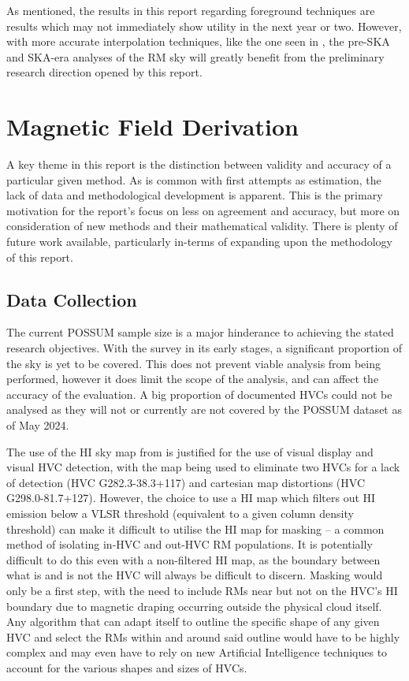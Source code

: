 As mentioned, the results in this report regarding foreground techniques are results which may not immediately show utility in the next year or two. However, with more accurate interpolation techniques, like the one seen in \cite{ID58}, the pre-SKA and SKA-era analyses of the RM sky will greatly benefit from the preliminary research direction opened by this report.

\section{Magnetic Field Derivation}
\label{sec:mag_disc}

A key theme in this report is the distinction between validity and accuracy of a particular given method. As is common with first attempts as estimation, the lack of data and methodological development is apparent. This is the primary motivation for the report's focus on less on agreement and accuracy, but more on consideration of new methods and their mathematical validity. There is plenty of future work available, particularly in-terms of expanding upon the methodology of this report.

\subsection{Data Collection}
\label{ssec:B1}

The current POSSUM sample size is a major hinderance to achieving the stated research objectives. With the survey in its early stages, a significant proportion of the sky is yet to be covered. This does not prevent viable analysis from being performed, however it does limit the scope of the analysis, and can affect the accuracy of the evaluation. A big proportion of documented HVCs could not be analysed as they will not or currently are not covered by the POSSUM dataset as of May 2024.


The use of the HI sky map from \cite{ID6} is justified for the use of visual display and visual HVC detection, with the map being used to eliminate two HVCs for a lack of detection (HVC G282.3-38.3+117) and cartesian map distortions (HVC G298.0-81.7+127). However, the choice to use a HI map which filters out HI emission below a VLSR threshold (equivalent to a given column density threshold) can make it difficult to utilise the HI map for masking – a common method of isolating in-HVC and out-HVC RM populations. It is potentially difficult to do this even with a non-filtered HI map, as the boundary between what is and is not the HVC will always be difficult to discern. Masking would only be a first step, with the need to include RMs near but not on the HVC's HI boundary due to magnetic draping occurring outside the physical cloud itself. Any algorithm that can adapt itself to outline the specific shape of any given HVC and select the RMs within and around said outline would have to be highly complex and may even have to rely on new Artificial Intelligence techniques to account for the various shapes and sizes of HVCs.


